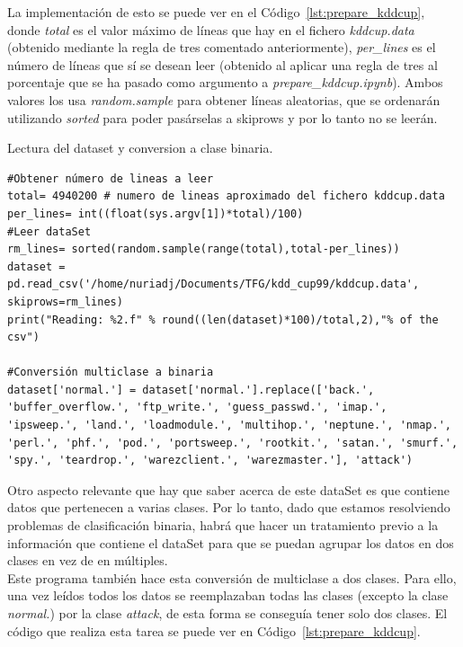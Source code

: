 \documentclass[a4paper, 12pt]{book}
\begin{document}
La implementación de esto se puede ver en el Código~\ref{lst:prepare_kddcup}, donde \textit{total} es el valor máximo de líneas que hay en el fichero \textit{kddcup.data} (obtenido mediante la regla de tres comentado anteriormente), \textit{per\_lines} es el número de líneas que sí se desean leer (obtenido al aplicar una regla de tres al porcentaje que se ha pasado como argumento a \textit{prepare\_kddcup.ipynb}). Ambos valores los usa \textit{random.sample} para obtener líneas aleatorias, que se ordenarán utilizando \textit{sorted} para poder pasárselas a skiprows y por lo tanto no se leerán. 

\begin{listing}[h!]
    \caption{Lectura del dataset y conversion a clase binaria.}{}
    \label{lst:prepare_kddcup}
    \begin{verbatim}
#Obtener número de lineas a leer
total= 4940200 # numero de lineas aproximado del fichero kddcup.data
per_lines= int((float(sys.argv[1])*total)/100)
#Leer dataSet
rm_lines= sorted(random.sample(range(total),total-per_lines))
dataset = pd.read_csv('/home/nuriadj/Documents/TFG/kdd_cup99/kddcup.data', skiprows=rm_lines)
print("Reading: %2.f" % round((len(dataset)*100)/total,2),"% of the csv")

#Conversión multiclase a binaria
dataset['normal.'] = dataset['normal.'].replace(['back.', 'buffer_overflow.', 'ftp_write.', 'guess_passwd.', 'imap.', 'ipsweep.', 'land.', 'loadmodule.', 'multihop.', 'neptune.', 'nmap.', 'perl.', 'phf.', 'pod.', 'portsweep.', 'rootkit.', 'satan.', 'smurf.', 'spy.', 'teardrop.', 'warezclient.', 'warezmaster.'], 'attack')
    \end{verbatim}
\end{listing}

Otro aspecto relevante que hay que saber acerca de este dataSet es que contiene datos que pertenecen a varias clases. Por lo tanto, dado que estamos resolviendo problemas de clasificación binaria, habrá que hacer un tratamiento previo a la información que contiene el dataSet para que se puedan agrupar los datos en dos clases en vez de en múltiples.\\
Este programa también hace esta conversión de multiclase a dos clases. Para ello, una vez leídos todos los datos se reemplazaban todas las clases (excepto la clase \textit{normal.}) por la clase \textit{attack}\cite{MulticlassToBinary}, de esta forma se conseguía tener solo dos clases. El código que realiza esta tarea se puede ver en Código~\ref{lst:prepare_kddcup}.
\end{document}
